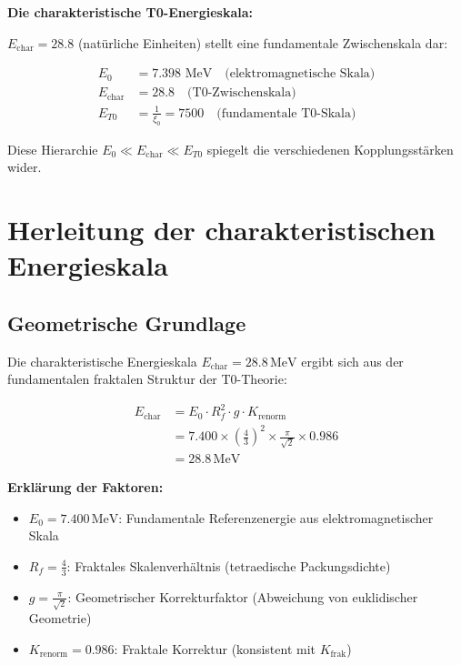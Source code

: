 	\begin{keyresult}
		\textbf{Die charakteristische T0-Energieskala:}
		
		$E_{\text{char}} = 28.8$ (natürliche Einheiten) stellt eine fundamentale Zwischenskala dar:
		
		\begin{align}
			E_0 &= 7.398 \text{ MeV} \quad \text{(elektromagnetische Skala)} \\
			E_{\text{char}} &= 28.8 \quad \text{(T0-Zwischenskala)} \\
			E_{T0} &= \frac{1}{\xi_0} = 7500 \quad \text{(fundamentale T0-Skala)}
		\end{align}
		
		Diese Hierarchie $E_0 \ll E_{\text{char}} \ll E_{T0}$ spiegelt die verschiedenen Kopplungsstärken wider.
	\end{keyresult}
	
	\section{Herleitung der charakteristischen Energieskala}
	
	\subsection{Geometrische Grundlage}
	
	Die charakteristische Energieskala $E_{\text{char}} = 28.8\,\text{MeV}$ ergibt sich aus der fundamentalen fraktalen Struktur der T0-Theorie:
	
	\begin{align}
		E_{\text{char}} &= E_0 \cdot R_f^2 \cdot g \cdot K_{\text{renorm}} \\
		&= 7.400 \times \left(\frac{4}{3}\right)^2 \times \frac{\pi}{\sqrt{2}} \times 0.986 \\
		&= 28.8\,\text{MeV}
	\end{align}
	
	\textbf{Erklärung der Faktoren:}
	\begin{itemize}
		\item $E_0 = 7.400\,\text{MeV}$: Fundamentale Referenzenergie aus elektromagnetischer Skala
		\item $R_f = \frac{4}{3}$: Fraktales Skalenverhältnis (tetraedische Packungsdichte)  
		\item $g = \frac{\pi}{\sqrt{2}}$: Geometrischer Korrekturfaktor (Abweichung von euklidischer Geometrie)
		\item $K_{\text{renorm}} = 0.986$: Fraktale Korrektur (konsistent mit $K_{\text{frak}}$)
	\end{itemize}
	
